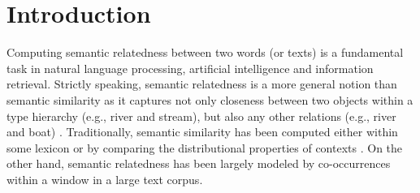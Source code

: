 \section{Introduction}
\label{sec:intro}
%
%
%
Computing semantic relatedness between two words (or texts)
is a fundamental task in natural language processing,
artificial intelligence and information retrieval. Strictly
speaking, semantic relatedness is a more general notion than
semantic similarity as it captures not only closeness between two
objects within a type hierarchy (e.g., river and stream), but also
any other relations (e.g., river and boat) \cite{Budanitsky:2006}.
Traditionally, semantic similarity has been computed either within
some lexicon \cite{Roget_Jarmasz,Resnik:1995,Jiang:1997,Lin:1998} 
or by comparing the distributional properties
of contexts \cite{LSA,ESA,SSA}.  On the
other hand, semantic relatedness has been largely modeled by
co-occurrences within a window in a large text corpus.

